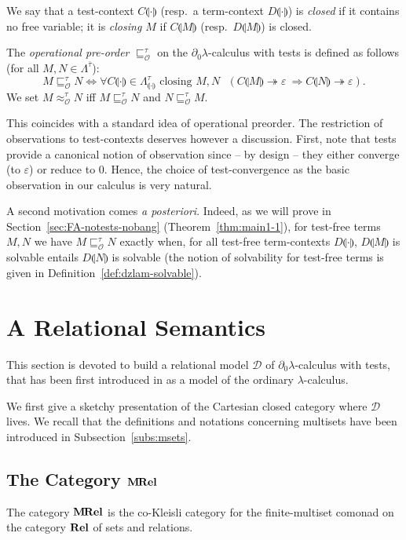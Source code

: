 \documentclass{LMCS}
\newcommand{\MRel}{\bold{M\hspace{-1pt}Rel}}
\newcommand{\dzlam}{\ensuremath{\partial_0\lambda}}
\newcommand{\lam}{\ensuremath{\lambda}}
\renewcommand{\hole}[1]{\llparenthesis #1\rrparenthesis}
\newcommand{\Set}[1]{\Lambda^{#1}}
\newcommand{\ContSet}{\Set{\gt}_{\hole{\cdot}}}
\newcommand{\msto}{\twoheadrightarrow}
\newcommand{\Tobsle}{\sqsubseteq^{\gt}_{\mathcal{O}}}
\newcommand{\Tobseq}{\approx^{\gt}_{\mathcal{O}}}
\renewcommand{\iff}{\Leftrightarrow}
\newcommand{\imp}{\Rightarrow}
\newcommand{\gt}{\ensuremath{\tau}}
\newcommand{\gto}{\ensuremath{\bar\tau}}
\newcommand{\cD}{\mathcal{D}}
\begin{document}
We say that a test-context $C\hole{\cdot}$ (resp.\ a term-context $D\hole{\cdot}$) is \emph{closed} if it contains no free variable;
it is \emph{closing $M$} if  $C\hole{M}$ (resp.\ $D\hole{M}$) is closed.

\begin{defi} \label{def:obsle}
The \emph{operational pre-order} $\Tobsle$ on the \dzlam-calculus with tests is defined as follows (for all $M,N \in\Set{\gto}$):
$$
	M\Tobsle N \iff \forall C\hole{\cdot}\in\ContSet\textrm{ closing $M,N$ }(C\hole{M}\msto \varepsilon\ \imp C\hole{N}\msto \varepsilon).
$$
We set $M\Tobseq N$ iff $M\Tobsle N$ and $N\Tobsle M$.
\end{defi}

This coincides with a standard idea of operational preorder. 
The restriction of observations to test-contexts deserves however a discussion. 
First, note that tests provide a canonical notion of observation since -- by design -- they either converge (to $\varepsilon$) or reduce to 0. 
Hence, the choice of test-convergence as the basic observation in our calculus is very natural.

A second motivation comes {\em a posteriori}. Indeed, as we will prove in Section~\ref{sec:FA-notests-nobang} (Theorem~\ref{thm:main1-1}), 
for test-free terms $M,N$ we have $M\Tobsle N$ exactly when, for all test-free term-contexts $D\hole{\cdot}$, $D\hole{M}$ is solvable entails $D\hole{N}$ is solvable 
(the notion of solvability for test-free terms is given in Definition~\ref{def:dzlam-solvable}).

\section{A Relational Semantics}\label{sec:rela-sem}	                         

This section is devoted to build a relational model $\cD$ of \dzlam-calculus with tests,
that has been first introduced in \cite{BucciarelliEM07} as a model of the ordinary \lam-calculus. 

We first give a sketchy presentation of the Cartesian closed category where $\cD$ lives. 
We recall that the definitions and notations concerning multisets have been introduced in Subsection~\ref{subs:msets}.

\subsection{The Category $\MRel$}
The category $\MRel$ is the co-Kleisli category for the finite-multiset comonad on the category $\bold{Rel}$ of sets and relations.
\end{document}

